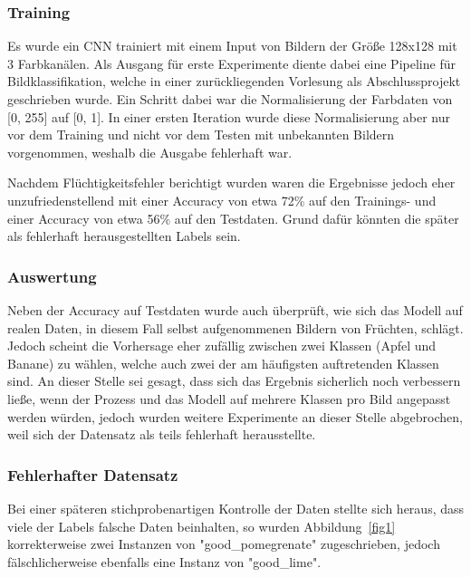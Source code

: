 \documentclass[runningheads]{llncs}
\begin{document}
\subsubsection{Training} Es wurde ein CNN trainiert mit einem Input von Bildern der Größe 128x128 mit 3 Farbkanälen. Als Ausgang für erste Experimente diente dabei eine Pipeline für Bildklassifikation, welche in einer zurückliegenden Vorlesung als Abschlussprojekt geschrieben wurde. Ein Schritt dabei war die Normalisierung der Farbdaten von [0, 255] auf [0, 1]. In einer ersten Iteration wurde diese Normalisierung aber nur vor dem Training und nicht vor dem Testen mit unbekannten Bildern vorgenommen, weshalb die Ausgabe fehlerhaft war.

Nachdem Flüchtigkeitsfehler berichtigt wurden waren die Ergebnisse jedoch eher unzufriedenstellend mit einer Accuracy von etwa 72\% auf den Trainings- und einer Accuracy von etwa 56\% auf den Testdaten. Grund dafür könnten die später als fehlerhaft herausgestellten Labels sein.

\subsubsection{Auswertung} Neben der Accuracy auf Testdaten wurde auch überprüft, wie sich das Modell auf realen Daten, in diesem Fall selbst aufgenommenen Bildern von Früchten, schlägt. Jedoch scheint die Vorhersage eher zufällig zwischen zwei Klassen (Apfel und Banane) zu wählen, welche auch zwei der am häufigsten auftretenden Klassen sind. An dieser Stelle sei gesagt, dass sich das Ergebnis sicherlich noch verbessern ließe, wenn der Prozess und das Modell auf mehrere Klassen pro Bild angepasst werden würden, jedoch wurden weitere Experimente an dieser Stelle abgebrochen, weil sich der Datensatz als teils fehlerhaft herausstellte.

\subsubsection{Fehlerhafter Datensatz} Bei einer späteren stichprobenartigen Kontrolle der Daten stellte sich heraus, dass viele der Labels falsche Daten beinhalten, so wurden Abbildung~\ref{fig1} korrekterweise zwei Instanzen von "good\_pomegrenate" zugeschrieben, jedoch fälschlicherweise ebenfalls eine Instanz von "good\_lime".
\end{document}
